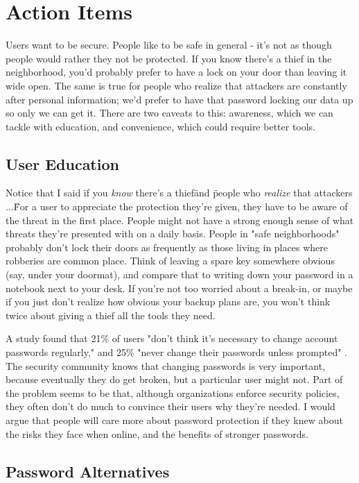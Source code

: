 \documentclass[jou]{apa6}
\begin{document}
\section{Action Items}
Users want to be secure. People like to be safe in general - it's not as though people would rather they not be protected. If you know there's a thief in the neighborhood, you'd probably prefer to have a lock on your door than leaving it wide open. The same is true for people who realize that attackers are constantly after personal information; we'd prefer to have that password locking our data up so only we can get it. There are two caveats to this: awareness, which we can tackle with education, and convenience, which could require better tools.

\subsection{User Education}
Notice that I said \"if you \emph{know} there's a thief\" and \"people who \emph{realize} that attackers ...\" For a user to appreciate the protection they're given, they have to be aware of the threat in the first place. People might not have a strong enough sense of what threats they're presented with on a daily basis. People in "safe neighborhoods" probably don't lock their doors as frequently as those living in places where robberies are common place. Think of leaving a spare key somewhere obvious (say, under your doormat), and compare that to writing down your password in a notebook next to your desk. If you're not too worried about a break-in, or maybe if you just don't realize how obvious your backup plans are, you won't think twice about giving a thief all the tools they need.

A study found that 21\% of users "don't think it's necessary to change account passwords regularly," and 25\% "never change their passwords unless prompted" \parencite{mcafee11}. The security community knows that changing passwords is very important, because eventually they do get broken, but a particular user might not. Part of the problem seems to be that, although organizations enforce security policies, they often don't do much to convince their users why they're needed. I would argue that people will care more about password protection if they knew about the risks they face when online, and the benefits of stronger passwords.


\subsection{Password Alternatives}
\end{document}
